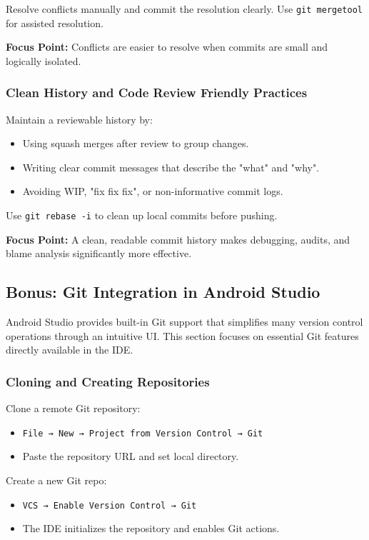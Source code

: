 \documentclass[a4paper,12pt]{article}
\begin{document}
Resolve conflicts manually and commit the resolution clearly. Use \texttt{git mergetool} for assisted resolution.

\textbf{Focus Point:} Conflicts are easier to resolve when commits are small and logically isolated.

\subsubsection{Clean History and Code Review Friendly Practices}

Maintain a reviewable history by:
\begin{itemize}
  \item Using squash merges after review to group changes.
  \item Writing clear commit messages that describe the "what" and "why".
  \item Avoiding WIP, "fix fix fix", or non-informative commit logs.
\end{itemize}

Use \texttt{git rebase -i} to clean up local commits before pushing.

\textbf{Focus Point:} A clean, readable commit history makes debugging, audits, and blame analysis significantly more effective.

\subsection{Bonus: Git Integration in Android Studio}

Android Studio provides built-in Git support that simplifies many version control operations through an intuitive UI. This section focuses on essential Git features directly available in the IDE.

\subsubsection{Cloning and Creating Repositories}

Clone a remote Git repository:
\begin{itemize}
  \item \texttt{File → New → Project from Version Control → Git}
  \item Paste the repository URL and set local directory.
\end{itemize}

Create a new Git repo:
\begin{itemize}
  \item \texttt{VCS → Enable Version Control → Git}
  \item The IDE initializes the repository and enables Git actions.
\end{itemize}
\end{document}
